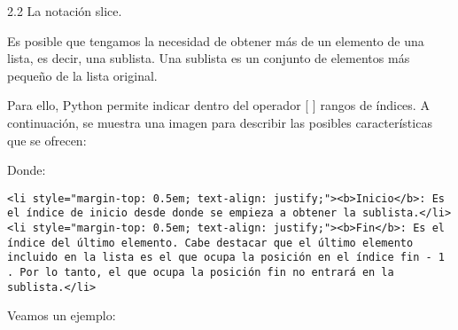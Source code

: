 \documentclass[11pt]{article}
\begin{document}
    2.2 La notación slice.

    Es posible que tengamos la necesidad de obtener más de un elemento de
una lista, es decir, una sublista. Una sublista es un conjunto de
elementos más pequeño de la lista original.

    

    Para ello, Python permite indicar dentro del operador {[} {]} rangos de
índices. A continuación, se muestra una imagen para describir las
posibles características que se ofrecen:

    

    Donde:

\begin{verbatim}
<li style="margin-top: 0.5em; text-align: justify;"><b>Inicio</b>: Es el índice de inicio desde donde se empieza a obtener la sublista.</li>
<li style="margin-top: 0.5em; text-align: justify;"><b>Fin</b>: Es el índice del último elemento. Cabe destacar que el último elemento incluido en la lista es el que ocupa la posición en el índice fin - 1 . Por lo tanto, el que ocupa la posición fin no entrará en la sublista.</li>
\end{verbatim}

Veamos un ejemplo:
\end{document}
